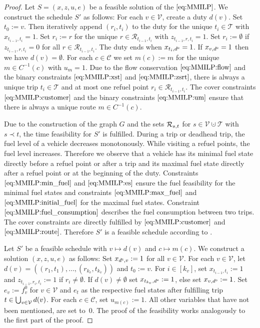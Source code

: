\begin{proof}

Let ${S=(x,z,u,e)}$ be a feasible solution of the $\eqref{eq:MMILP}$. We construct the schedule $S'$ as follows: For each ${v\in\mathcal{V}}$, create a duty $d(v)$. Set ${t_0:=v}$. Then iteratively append $\left(r_i,t_i\right)$ to the duty for the unique ${t_i\in\mathcal{T}}$ with ${x_{t_{i-1},t_i}=1}$. Set ${r_i:=r}$ for the unique ${r\in\mathcal{R}_{t_{i-1},t_i}}$ with ${z_{t_{i-1},r,t_i}=1}$. Set ${r_i:=\emptyset}$ if ${z_{t_{i-1},r,t_i}=0}$ for all ${r\in\mathcal{R}_{t_{i-1},t_i}}$. The duty ends when ${x_{t_i,d^{\operatorname{e}}}=1}$. If ${x_{v,d^{\operatorname{e}}}=1}$ then we have ${d(v)=\emptyset}$. For each ${c\in\mathcal{C}}$ we set ${m(c):=m}$ for the unique ${m\in C^{-1}(c)}$ with ${u_m=1}$. Due to the flow conservation $\eqref{eq:MMILP:flow}$ and the binary constraints $\eqref{eq:MMILP:xst}$ and $\eqref{eq:MMILP:zsrt}$, there is always a unique trip ${t_i\in\mathcal{T}}$ and at most one refuel point ${r_i\in\mathcal{R}_{t_{i-1},t_i}}$. The cover constraints $\eqref{eq:MMILP:customer}$ and the binary constraints $\eqref{eq:MMILP:um}$ ensure that there is always a unique route ${m\in C^{-1}(c)}$.

Due to the construction of the graph $G$ and the sets $\mathcal{R}_{s,t}$ for ${s\in\mathcal{V}\cupdot\mathcal{T}}$ with $s\prec t$, the time feasibility for $S'$ is fulfilled. During a trip or deadhead trip, the fuel level of a vehicle decreases monotonously. While visiting a refuel points, the fuel level increases. Therefore we observe that a vehicle has its minimal fuel state directly before a refuel point or after a trip and its maximal fuel state directly after a refuel point or at the beginning of the duty. Constraints $\eqref{eq:MMILP:min_fuel}$ and $\eqref{eq:MMILP:es}$ ensure the fuel feasibility for the minimal fuel states and constraints $\eqref{eq:MMILP:max_fuel}$ and $\eqref{eq:MMILP:initial_fuel}$ for the maximal fuel states. Constraint $\eqref{eq:MMILP:fuel_consumption}$ describes the fuel consumption between two trips. The cover constraints are directly fulfilled by $\eqref{eq:MMILP:customer}$ and $\eqref{eq:MMILP:route}$. Therefore $S'$ is a feasible schedule according to .

Let $S'$ be a feasible schedule with $v\mapsto d(v)$ and $c\mapsto m(c)$. We construct a solution $(x,z,u,e)$ as follows: Set ${x_{d^{\operatorname{s}},v}:=1}$ for all ${v\in\mathcal{V}}$. For each ${v\in\mathcal{V}}$, let
${d(v)=\left(\left(r_1,t_1\right),\dots,\left(r_{k_v},t_{k_v}\right)\right)}$ and ${t_0:= v}$. For ${i\in\left[k_v\right]}$, set ${x_{t_{i-1},t_i}:=1}$ and
${z_{t_{i-1},r_i,t_i}:=1}$ if ${r_i\neq\emptyset}$. If ${d(v)\neq\emptyset}$ set ${x_{t_{k_v},d^{\operatorname{e}}}:=1}$, else set ${x_{v,d^{\operatorname{e}}}:=1}$. Set ${e_v:=f^0_v}$ for ${v\in\mathcal{V}}$ and $e_t$ as the respective fuel states after fulfilling trip ${t\in\bigcup_{v\in\mathcal{V}} d(v)}$. For each ${c\in\mathcal{C}}$, set ${u_{m(c)}:=1}$. All other variables that have not been mentioned, are set to~$0$. The proof of the feasibility works analogously to the first part of the proof.


\end{proof}
